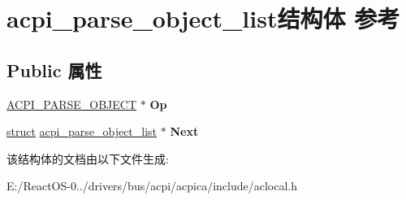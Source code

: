 \hypertarget{structacpi__parse__object__list}{}\section{acpi\+\_\+parse\+\_\+object\+\_\+list结构体 参考}
\label{structacpi__parse__object__list}
\subsection*{Public 属性}
\begin{DoxyCompactItemize}
\item 
\mbox{\label{structacpi__parse__object__list_a34dd7a35cdf7e3777e587f39a22e0228}} 
\hyperlink{unionacpi__parse__object}{A\+C\+P\+I\+\_\+\+P\+A\+R\+S\+E\+\_\+\+O\+B\+J\+E\+CT} $\ast$ {\bfseries Op}
\item 
\mbox{\label{structacpi__parse__object__list_a10ced81fe0a578f31f28a1a1cbc1078c}} 
\hyperlink{interfacestruct}{struct} \hyperlink{structacpi__parse__object__list}{acpi\+\_\+parse\+\_\+object\+\_\+list} $\ast$ {\bfseries Next}
\end{DoxyCompactItemize}


该结构体的文档由以下文件生成\+:\begin{DoxyCompactItemize}
\item 
E\+:/\+React\+O\+S-\/0../drivers/bus/acpi/acpica/include/aclocal.\+h\end{DoxyCompactItemize}
